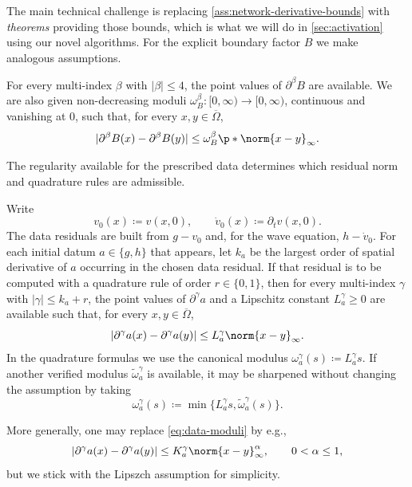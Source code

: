 The main technical challenge is replacing \cref{ass:network-derivative-bounds}
with \emph{theorems} providing those bounds, which is what we will do in
\cref{sec:activation} using our novel algorithms.  For the explicit boundary
factor $B$ we make analogous assumptions.

\begin{assumption}\label{ass:B-moduli}
For every multi-index $\beta$ with $|\beta|\leq 4$, the point values of
$\partial^\beta B$ are available.  We are also given non-decreasing moduli
$\omega_B^\beta\colon[0,\infty)\to[0,\infty)$, continuous and vanishing at
$0$, such that, for every $x,y\in\overline{\Omega}$,
\begin{equation}\label{eq:B-moduli}
  |\partial^\beta B(x)-\partial^\beta B(y)|
  \leq
  \omega_B^\beta\p*{\norm{x-y}_\infty}.
\end{equation}
\end{assumption}

The regularity available for the prescribed
data determines which residual norm and quadrature rules are admissible.

\begin{assumption}\label{ass:data-moduli}
Write
\begin{equation}\label{eq:initial-data}
  v_0(x)\coloneqq v(x,0),
  \qquad
  \dot v_0(x)\coloneqq \partial_t v(x,0).
\end{equation}
The data residuals are built from $g-v_0$ and, for the wave equation,
$h-\dot v_0$.  For each initial datum $a\in\{g,h\}$ that appears, let $k_a$ be
the largest order of spatial derivative of $a$ occurring in the chosen data
residual.  If that residual is to be computed with a quadrature rule of order
$r\in\{0,1\}$, then for every multi-index $\gamma$ with $|\gamma|\leq k_a+r$,
the point values of $\partial^\gamma a$ and a Lipschitz constant
$L_a^\gamma\geq0$ are available such that, for every
$x,y\in\overline{\Omega}$,
\begin{equation}\label{eq:data-moduli}
  |\partial^\gamma a(x)-\partial^\gamma a(y)|
  \leq
  L_a^\gamma\norm{x-y}_\infty.
\end{equation}
In the quadrature formulas we use the canonical modulus
$\omega_a^\gamma(s)\coloneqq L_a^\gamma s$.  If another verified modulus
$\widetilde\omega_a^\gamma$ is available, it may be sharpened without
changing the assumption by taking
\[
    \omega_a^\gamma(s)
    \coloneqq
    \min\{L_a^\gamma s,\widetilde\omega_a^\gamma(s)\}.
\]
\end{assumption}

\begin{remark}
More generally, one may replace \eqref{eq:data-moduli} by e.g., 
\[
    |\partial^\gamma a(x)-\partial^\gamma a(y)|
    \leq
    K_a^\gamma\norm{x-y}_\infty^\alpha,
    \qquad 0<\alpha\leq1,
\]
but we stick with the Lipszch assumption for simplicity.  
\end{remark}
